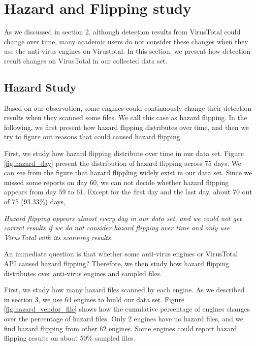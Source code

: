 \section{Hazard and Flipping study}

As we discussed in section 2, although detection results from VirusTotal could change over time, many academic users do not consider these changes when they use the anti-virus engines on Virustotal. In this section, we present how detection result changes on VirusTotal in our collected data set.



\subsection{Hazard Study}

Based on our observation, some engines could continuously change their detection results when they scanned some files. We call this case as hazard flipping. In the following, we first present how hazard flipping distributes over time, and then we try to figure out reasons that could caused hazard flipping.

First, we study how hazard flipping distribute over time in our data set. Figure \ref{fig:hazard_day} present the distribution of hazard flipping across 75 days. We can see from the figure that hazard flippling widely exist in our data set. Since we missed some reports on day 60, we can not decide whether hazard flipping appears from day 59 to 61. Except for the first day and the last day, about 70 out of 75 (93.33\%) days,

{\it{Hazard flipping appears almost every day in our data set, and we could not get correct results if we do not consider hazard flipping over time and only use VirusTotal with its scanning results. 
}}

An immediate question is that whether some anti-virus engines or VirusTotal API caused hazard flipping? Therefore, we then study how hazard flipping distributes over anti-virus engines and sampled files.

First, we study how many hazard files scanned by each engine. As we described in section 3, we use 64 engines to build our data set. Figure \ref{fig:hazard_vendor_file} shows how the cumulative percentage of engines changes over the percentage of hazard files. Only 2 engines have no hazard files, and we find hazard flipping from other 62 engines. Some engines could report hazard flipping results on about 50\% sampled files.

